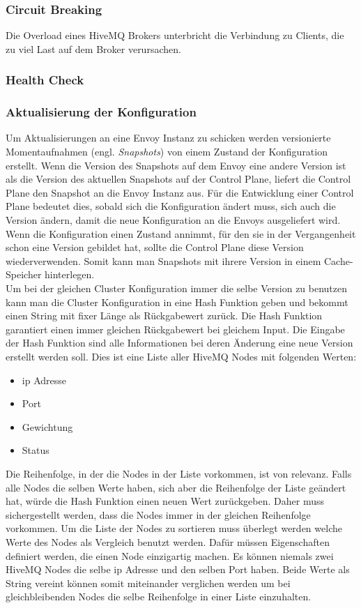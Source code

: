\subsubsection{Circuit Breaking}
Die Overload eines HiveMQ Brokers unterbricht die Verbindung zu Clients, die zu viel Last auf dem Broker verursachen.

\subsubsection{Health Check}

\subsubsection{Aktualisierung der Konfiguration}
Um Aktualisierungen an eine Envoy Instanz zu schicken werden versionierte Momentaufnahmen (engl. \textit{Snapshots}) von einem Zustand der Konfiguration erstellt. Wenn die Version des Snapshots auf dem Envoy eine andere Version ist als die Version des aktuellen Snapshots auf der Control Plane, liefert die Control Plane den Snapshot an die Envoy Instanz aus.
Für die Entwicklung einer Control Plane bedeutet dies, sobald sich die Konfiguration ändert muss, sich auch die Version ändern, damit die neue Konfiguration an die Envoys ausgeliefert wird. Wenn die Konfiguration einen Zustand annimmt, für den sie in der Vergangenheit schon eine Version gebildet hat, sollte die Control Plane diese Version wiederverwenden. Somit kann man Snapshots mit ihrere Version in einem Cache-Speicher hinterlegen.
\\
Um bei der gleichen Cluster Konfiguration immer die selbe Version zu benutzen kann man die Cluster Konfiguration in eine Hash Funktion geben und bekommt einen String mit fixer Länge als Rückgabewert zurück. Die Hash Funktion garantiert einen immer gleichen Rückgabewert bei gleichem Input.
Die Eingabe der Hash Funktion sind alle Informationen bei deren Änderung eine neue Version erstellt werden soll. Dies ist eine Liste aller HiveMQ Nodes mit folgenden Werten:
\begin{itemize}
  \item \ac{ip} Adresse
  \item Port
  \item Gewichtung
  \item Status
\end{itemize}
Die Reihenfolge, in der die Nodes in der Liste vorkommen, ist von relevanz. Falls alle Nodes die selben Werte haben, sich aber die Reihenfolge der Liste geändert hat, würde die Hash Funktion einen neuen Wert zurückgeben. Daher muss sichergestellt werden, dass die Nodes immer in der gleichen Reihenfolge vorkommen. Um die Liste der Nodes zu sortieren muss überlegt werden welche Werte des Nodes als Vergleich benutzt werden. Dafür müssen Eigenschaften definiert werden, die einen Node einzigartig machen.
Es können niemals zwei HiveMQ Nodes die selbe \ac{ip} Adresse und den selben Port haben. Beide Werte als String vereint können somit miteinander verglichen werden um bei gleichbleibenden Nodes die selbe Reihenfolge in einer Liste einzuhalten.

